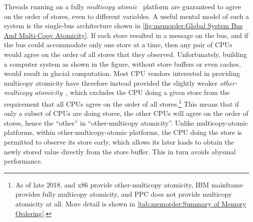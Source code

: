 Threads running on a fully
\emph{multicopy atomic}~\cite{Stone:1995:SP:623262.623912}
platform are guaranteed
to agree on the order of stores, even to different variables.
A useful mental model of such a system is the single-bus architecture
shown in
\cref{fig:memorder:Global System Bus And Multi-Copy Atomicity}.
If each store resulted in a message on the bus, and if the bus could
accommodate only one store at a time, then any pair of CPUs would
agree on the order of all stores that they observed.
Unfortunately, building a computer system as shown in the figure,
without store buffers or even caches, would result in glacial computation.
Most CPU vendors interested in providing multicopy atomicity have therefore
instead provided the slightly weaker
\emph{other-multicopy atomicity}~\cite[Section B2.3]{ARMv8A:2017},
which excludes the CPU doing a given store from the requirement that all
CPUs agree on the order of all stores.\footnote{
	As of late 2018,  and x86 provide other-multicopy atomicity,
	IBM mainframe provides fully multicopy atomicity, and PPC does
	not provide multicopy atomicity at all. More detail is shown in
	\cref{tab:memorder:Summary of Memory Ordering}.}
This means that if only a subset of CPUs are doing stores, the
other CPUs will agree on the order of stores, hence the ``other''
in ``other-multicopy atomicity''.
Unlike multicopy-atomic platforms, within other-multicopy-atomic platforms,
the CPU doing the store is permitted to observe its
store early, which allows its later loads to obtain the newly stored
value directly from the store buffer.
This in turn avoids abysmal performance.

